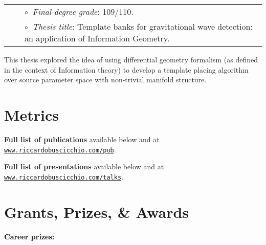 \vspace{0.2cm}
\vspace{-0.1cm}
\begin{tabular}{rcl}
&\hspace{0.4cm} &$\circ\;\;${\textit{Final degree grade}}: 109/110.\\
&\hspace{0.4cm} &$\circ\;\;${\textit{Thesis title}}: Template banks for gravitational wave detection: an application of Information Geometry.
\end{tabular}
\vspace{0.2cm}


This thesis explored the idea of using differential geometry formalism (as defined in the context of Information theory) to develop a template placing algorithm over source parameter space with non-trivial manifold structure.

\newpage{}


\section{Metrics}



\textbf{Full list of publications} available 
below and
at \href{http://www.riccardobuscicchio.com/pub}{\texttt{www.riccardobuscicchio.com/pub}}.

%

\textbf{Full list of presentations} available
below and
at \href{http://www.riccardobuscicchio.com/talks}{\texttt{www.riccardobuscicchio.com/talks}}.

\section{Grants, Prizes, \& Awards}

\textbf{\textcolor{black}{Career prizes:}}
\vspace{0.1cm}

\vspace{-0.1cm}
\vspace{-0.1cm}

